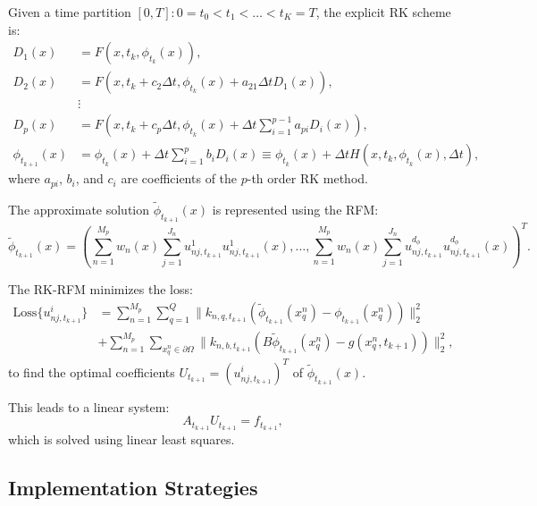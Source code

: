 \documentclass[11pt]{article}
\begin{document}
Given a time partition $[0,T]: 0 = t_0 < t_1 < \ldots < t_K = T$, the explicit RK scheme is:
\begin{align}
    D_1(x) &= F(x,t_k,\phi_{t_k}(x)), \\
    D_2(x) &= F(x,t_k+c_2\Delta t,\phi_{t_k}(x)+a_{21}\Delta t D_1(x)), \\
    &\vdots \\
    D_p(x) &= F(x,t_k+c_p\Delta t,\phi_{t_k}(x)+\Delta t\sum_{i=1}^{p-1}a_{pi}D_i(x)), \\
    \phi_{t_{k+1}}(x) &= \phi_{t_k}(x)+\Delta t\sum_{i=1}^{p}b_i D_i(x) \equiv \phi_{t_k}(x)+\Delta t H(x,t_k,\phi_{t_k}(x),\Delta t),
\end{align}
where $a_{pi}$, $b_i$, and $c_i$ are coefficients of the $p$-th order RK method.

The approximate solution $\tilde{\phi}_{t_{k+1}}(x)$ is represented using the RFM:
\begin{equation}
    \tilde{\phi}_{t_{k+1}}(x) = \left(\sum_{n=1}^{M_p}w_n(x)\sum_{j=1}^{J_n}u^1_{nj,t_{k+1}}u^1_{nj,t_{k+1}}(x), \ldots, \sum_{n=1}^{M_p}w_n(x)\sum_{j=1}^{J_n}u^{d_\phi}_{nj,t_{k+1}}u^{d_\phi}_{nj,t_{k+1}}(x)\right)^T.
\end{equation}

The RK-RFM minimizes the loss:
\begin{align}
    \text{Loss}\{u^i_{nj,t_{k+1}}\} &= \sum_{n=1}^{M_p}\sum_{q=1}^{Q}\|k_{n,q,t_{k+1}}(\tilde{\phi}_{t_{k+1}}(x^n_q) - \phi_{t_{k+1}}(x^n_q))\|^2_2 \\
    &+ \sum_{n=1}^{M_p}\sum_{x^n_q \in \partial\Omega}\|k_{n,b,t_{k+1}}(B\tilde{\phi}_{t_{k+1}}(x^n_q) - g(x^n_q,t_{k+1}))\|^2_2,
\end{align}
to find the optimal coefficients $U_{t_{k+1}} = (u^i_{nj,t_{k+1}})^T$ of $\tilde{\phi}_{t_{k+1}}(x)$.

This leads to a linear system:
\begin{equation}
    A_{t_{k+1}}U_{t_{k+1}} = f_{t_{k+1}},
\end{equation}
which is solved using linear least squares.

\subsection{Implementation Strategies}
\end{document}
